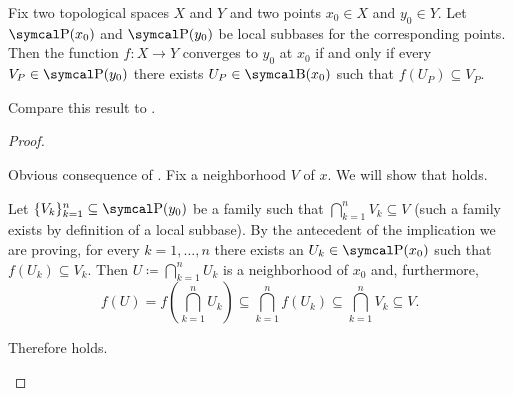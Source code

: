 \begin{proposition}\label{thm:cauchy_function_convergence_via_subbases}
  Fix two topological spaces \( X \) and \( Y \) and two points \( x_0 \in X \) and \( y_0 \in Y \). Let \( \CP(x_0) \) and \( \CP(y_0) \) be local subbases for the corresponding points. Then the function \( f: X \to Y \) converges to \( y_0 \) at \( x_0 \) if and only if every \( V_P \in \CP(y_0) \) there exists \( U_P \in \CB(x_0) \) such that \( f(U_P) \subseteq V_P \).

  Compare this result to .
\end{proposition}
\begin{proof}\mbox{}
  \begin{description}
    \Implies Obvious consequence of .
    \ImpliedBy Fix a neighborhood \( V \) of \( x \). We will show that  holds.

    Let \( \{ V_k \}_{k=1}^n \subseteq \CP(y_0) \) be a family such that \( \bigcap_{k=1}^n V_k \subseteq V \) (such a family exists by definition of a local subbase). By the antecedent of the implication we are proving, for every \( k = 1, \ldots, n \) there exists an \( U_k \in \CP(x_0) \) such that \( f(U_k) \subseteq V_k \). Then \( U \coloneqq \bigcap_{k=1}^n U_k \) is a neighborhood of \( x_0 \) and, furthermore,
    \begin{equation*}
      f(U)
      =
      f\left(\bigcap_{k=1}^n U_k \right)
      \subseteq
      \bigcap_{k=1}^n f(U_k)
      \subseteq
      \bigcap_{k=1}^n V_k
      \subseteq
      V.
    \end{equation*}

    Therefore  holds.
  \end{description}
\end{proof}
